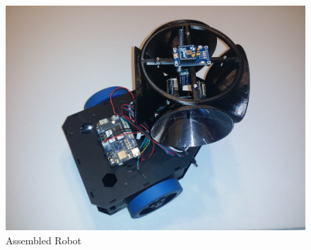 \documentclass[fontsize=11pt, %
                             paper=letter, %
                             openany, %
                             captions=tableheading,
                             index=totoc,
                             hyperref]{labbook}
\begin{document}
\begin{addmargin}[0cm]{0cm}
\begin{figure}[h!]
    \center
    \includegraphics[width=5in]{figs/img/robotImages/assembledRobot.jpg}
    \caption{Assembled Robot}
    \label{fig:assembledRobot}
\end{figure}

\end{addmargin}
\end{document}
